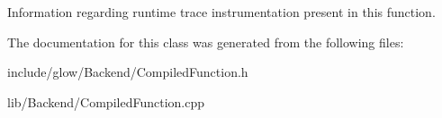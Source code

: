 Information regarding runtime trace instrumentation present in this function. 

The documentation for this class was generated from the following files\+:\begin{DoxyCompactItemize}
\item 
include/glow/\+Backend/Compiled\+Function.\+h\item 
lib/\+Backend/Compiled\+Function.\+cpp\end{DoxyCompactItemize}
